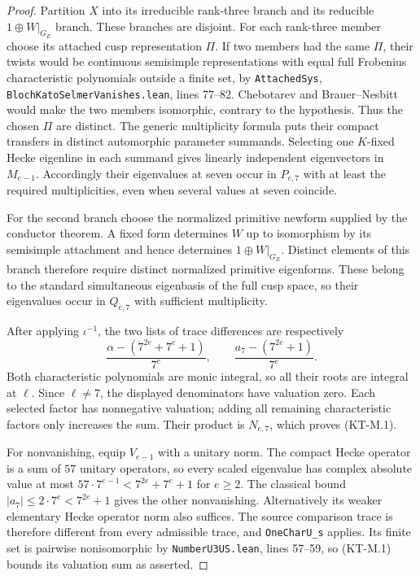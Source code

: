\begin{proof}
Partition $X$ into its irreducible rank-three branch and its
reducible $1\oplus W|_{G_E}$ branch. These branches are disjoint.
For each rank-three member choose its attached cusp representation
$\Pi$. If two members had the same $\Pi$, their twists would be
continuous semisimple representations with equal full Frobenius
characteristic polynomials outside a finite set, by
\texttt{AttachedSys},
\texttt{BlochKatoSelmerVanishes.lean}, lines 77--82.
Chebotarev and Brauer--Nesbitt would make the two members
isomorphic, contrary to the hypothesis.
Thus the chosen $\Pi$ are distinct.
The generic multiplicity formula puts their compact transfers
in distinct automorphic parameter summands. Selecting one
$K$-fixed Hecke eigenline in each summand gives linearly
independent eigenvectors in $M_{e-1}$.
Accordingly their eigenvalues at seven occur in $P_{e,7}$ with
at least the required multiplicities, even when several values
at seven coincide.

For the second branch choose the normalized primitive newform
supplied by the conductor theorem. A fixed form determines $W$
up to isomorphism by its semisimple attachment and hence determines
$1\oplus W|_{G_E}$. Distinct elements of this branch therefore
require distinct normalized primitive eigenforms. These belong
to the standard simultaneous eigenbasis of the full cusp space,
so their eigenvalues occur in $Q_{e,7}$ with sufficient
multiplicity.

After applying $\iota^{-1}$, the two lists of trace differences
are respectively
\[
 \frac{\alpha-(7^{2e}+7^e+1)}{7^e},\qquad
 \frac{a_7-(7^{2e}+1)}{7^e}.
\]
Both characteristic polynomials are monic integral, so all their
roots are integral at $\ell$. Since $\ell\ne7$, the displayed
denominators have valuation zero. Each selected factor has
nonnegative valuation; adding all remaining characteristic
factors only increases the sum. Their product is $N_{e,7}$,
which proves (KT-M.1).

For nonvanishing, equip $V_{e-1}$ with a unitary norm.
The compact Hecke operator is a sum of $57$ unitary operators,
so every scaled eigenvalue has complex absolute value at most
$57\cdot7^{e-1}<7^{2e}+7^e+1$ for $e\geq2$.
The classical bound $|a_7|\leq2\cdot7^e<7^{2e}+1$ gives the
other nonvanishing. Alternatively its weaker elementary Hecke
operator norm also suffices.
The source comparison trace is therefore different from every
admissible trace, and \texttt{OneCharU\_s} applies.
Its finite set is pairwise nonisomorphic by
\texttt{NumberU3US.lean}, lines 57--59, so (KT-M.1) bounds its
valuation sum as asserted.
\end{proof}

